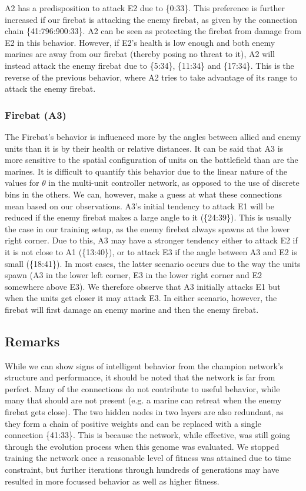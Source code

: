 \documentclass[10pt,a4paper,twocolumn]{article}
\begin{document}
A2 has a predisposition to attack E2 due to \{0:33\}. This preference is further increased if our firebat is attacking the enemy firebat, as given by the connection chain \{41:796:900:33\}. A2 can be seen as protecting the firebat from damage from E2 in this behavior. However, if E2's health is low enough and both enemy marines are away from our firebat (thereby posing no threat to it), A2 will instead attack the enemy firebat due to \{5:34\}, \{11:34\} and \{17:34\}. This is the reverse of the previous behavior, where A2 tries to take advantage of its range to attack the enemy firebat.

\subsubsection{Firebat (A3)}
\label{sec:network_out_a1}

The Firebat's behavior is influenced more by the angles between allied and enemy units than it is by their health or relative distances. It can be said that A3 is more sensitive to the spatial configuration of units on the battlefield than are the marines. It is difficult to quantify this behavior due to the linear nature of the values for $\theta$ in the multi-unit controller network, as opposed to the use of discrete bins in the others. We can, however, make a guess at what these connections mean based on our observations. A3's initial tendency to attack E1 will be reduced if the enemy firebat makes a large angle to it (\{24:39\}). This is usually the case in our training setup, as the enemy firebat always spawns at the lower right corner. Due to this, A3 may have a stronger tendency either to attack E2 if it is not close to A1 (\{13:40\}), or to attack E3 if the angle between A3 and E2 is small (\{18:41\}). In most cases, the latter scenario occurs due to the way the units spawn (A3 in the lower left corner, E3 in the lower right corner and E2 somewhere above E3). We therefore observe that A3 initially attacks E1 but when the units get closer it may attack E3. In either scenario, however, the firebat will first damage an enemy marine and then the enemy firebat.

\subsection{Remarks}
\label{sec:network_remarks}

While we can show signs of intelligent behavior from the champion network's structure and performance, it should be noted that the network is far from perfect. Many of the connections do not contribute to useful behavior, while many that should are not present (e.g. a marine can retreat when the enemy firebat gets close). The two hidden nodes in two layers are also redundant, as they form a chain of positive weights and can be replaced with a single connection \{41:33\}. This is because the network, while effective, was still going through the evolution process when this genome was evaluated. We stopped training the network once a reasonable level of fitness was attained due to time constraint, but further iterations through hundreds of generations may have resulted in more focussed behavior as well as higher fitness.
\end{document}
